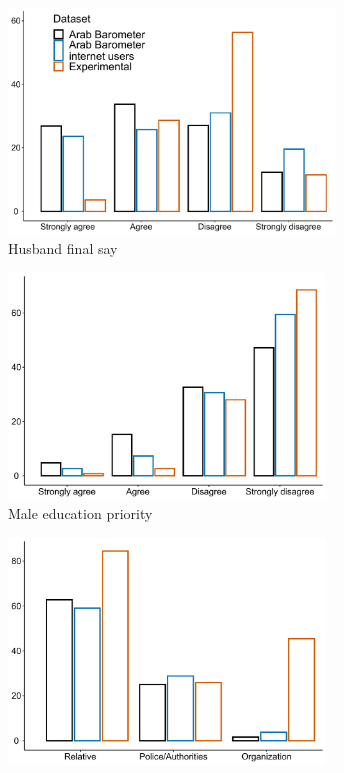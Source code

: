 \documentclass[12pt]{article}
\begin{document}
\begin{figure}[H]
\caption{Comparison of attitudes and behavior between Arab Barometer and experimental sample respondents}
   \begin{minipage}{1\textwidth} 
   \begin{subfigure}[b]{0.48\linewidth}
    \centering
    \includegraphics[height=6cm,width=8cm\linewidth]{Figures/AB/white/husb_fs.pdf} 
    \caption{Husband final say} 
    \label{} 
  \end{subfigure}
  \hspace{\fill}
  \begin{subfigure}[b]{0.48\linewidth}
    \centering
    \includegraphics[height=6cm,width=8cm\linewidth]{Figures/AB/white/prio_educ.pdf} 
    \caption{Male education priority} 
    \label{} 
  \end{subfigure} 
   \begin{subfigure}[b]{0.48\linewidth}
    \centering
    \includegraphics[height=6cm,width=8cm\linewidth]{Figures/AB/white/support.pdf} 

\end{subfigure}
\end{minipage}
\end{figure}
\end{document}
